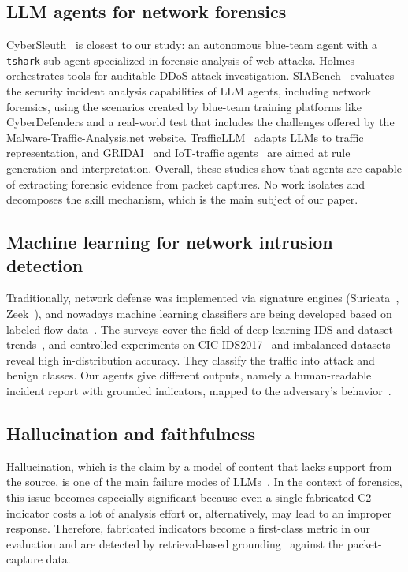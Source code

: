 \documentclass[conference]{IEEEtran}
\begin{document}
\subsection{LLM agents for network forensics}
CyberSleuth~\cite{cybersleuth2026} is closest to our study: an autonomous blue-team agent
with a \texttt{tshark} sub-agent specialized in forensic analysis of web attacks.
Holmes~\cite{holmes2026} orchestrates tools for auditable DDoS attack investigation.
SIABench~\cite{handoverwheel2026} evaluates the security incident analysis capabilities of
LLM agents, including network forensics, using the scenarios created by blue-team training
platforms like CyberDefenders and a real-world test that includes the challenges offered by
the Malware-Traffic-Analysis.net website. TrafficLLM~\cite{trafficllm2025} adapts LLMs to
traffic representation, and GRIDAI~\cite{gridai2025} and IoT-traffic
agents~\cite{iotagent2025} are aimed at rule generation and interpretation. Overall, these
studies show that agents are capable of extracting forensic evidence from packet captures.
No work isolates and decomposes the skill mechanism, which is the main subject of our paper.

\subsection{Machine learning for network intrusion detection}
Traditionally, network defense was implemented via signature engines
(Suricata~\cite{suricata}, Zeek~\cite{zeek}), and nowadays machine learning classifiers are
being developed based on labeled flow data~\cite{cicids2017,idsdatasets2021}. The surveys
cover the field of deep learning IDS and dataset trends~\cite{idsdatasets2021}, and
controlled experiments on CIC-IDS2017~\cite{cicids2017eval2025} and imbalanced
datasets~\cite{mlnids2024} reveal high in-distribution accuracy. They classify the traffic
into attack and benign classes. Our agents give different outputs, namely a human-readable
incident report with grounded indicators, mapped to the adversary's
behavior~\cite{mitreattack2018}.

\subsection{Hallucination and faithfulness}
Hallucination, which is the claim by a model of content that lacks support from the source,
is one of the main failure modes of LLMs~\cite{ji2023hallucination,huang2025hallucination}.
In the context of forensics, this issue becomes especially significant because even a single
fabricated C2 indicator costs a lot of analysis effort or, alternatively, may lead to an
improper response. Therefore, fabricated indicators become a first-class metric in our
evaluation and are detected by retrieval-based grounding~\cite{lewis2020rag} against the
packet-capture data.
\end{document}
